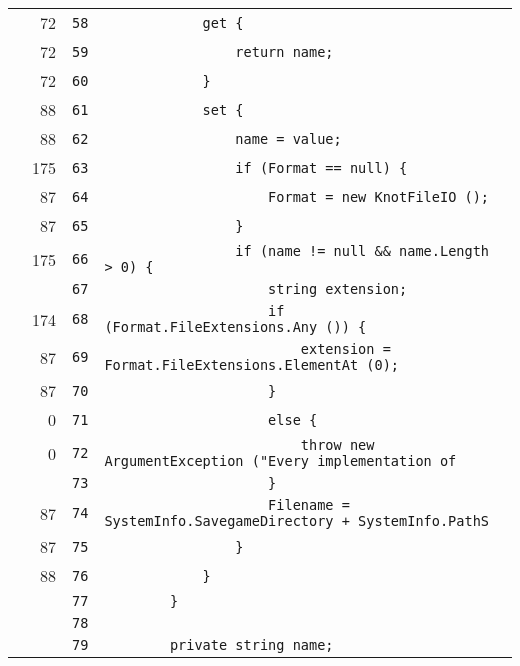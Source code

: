 \documentclass[a4paper,10pt]{article}
\begin{document}
\begin{longtable}[l]{lrrl}
\cellcolor{green} & 72 & \verb~58~ & \verb~            get {~\\
\cellcolor{green} & 72 & \verb~59~ & \verb~                return name;~\\
\cellcolor{green} & 72 & \verb~60~ & \verb~            }~\\
\cellcolor{green} & 88 & \verb~61~ & \verb~            set {~\\
\cellcolor{green} & 88 & \verb~62~ & \verb~                name = value;~\\
\cellcolor{green} & 175 & \verb~63~ & \verb~                if (Format == null) {~\\
\cellcolor{green} & 87 & \verb~64~ & \verb~                    Format = new KnotFileIO ();~\\
\cellcolor{green} & 87 & \verb~65~ & \verb~                }~\\
\cellcolor{green} & 175 & \verb~66~ & \verb~                if (name != null && name.Length > 0) {~\\
\cellcolor{gray} &  & \verb~67~ & \verb~                    string extension;~\\
\cellcolor{green} & 174 & \verb~68~ & \verb~                    if (Format.FileExtensions.Any ()) {~\\
\cellcolor{green} & 87 & \verb~69~ & \verb~                        extension = Format.FileExtensions.ElementAt (0);~\\
\cellcolor{green} & 87 & \verb~70~ & \verb~                    }~\\
\cellcolor{red} & 0 & \verb~71~ & \verb~                    else {~\\
\cellcolor{red} & 0 & \verb~72~ & \verb~                        throw new ArgumentException ("Every implementation of ~\\
\cellcolor{gray} &  & \verb~73~ & \verb~                    }~\\
\cellcolor{green} & 87 & \verb~74~ & \verb~                    Filename = SystemInfo.SavegameDirectory + SystemInfo.PathS~\\
\cellcolor{green} & 87 & \verb~75~ & \verb~                }~\\
\cellcolor{green} & 88 & \verb~76~ & \verb~            }~\\
\cellcolor{gray} &  & \verb~77~ & \verb~        }~\\
\cellcolor{gray} &  & \verb~78~ & \verb~~\\
\cellcolor{gray} &  & \verb~79~ & \verb~        private string name;~\\

\end{longtable}
\end{document}
